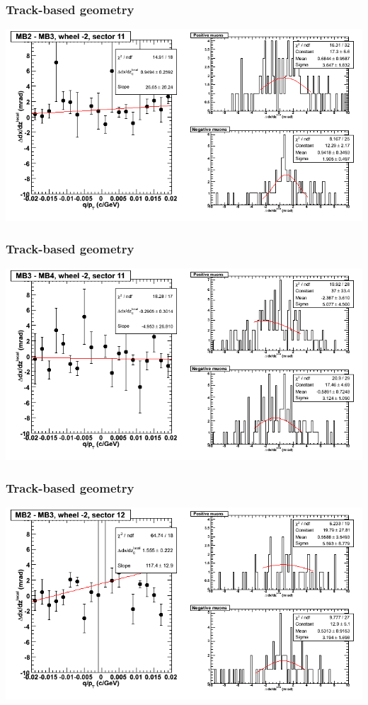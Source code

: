 \documentclass[compress]{beamer}
\begin{document}
\begin{frame}
\frametitle{Track-based geometry}
\includegraphics[width=\linewidth]{NOV4_segdiffs/dt13_slope_A_11_23.png}
\end{frame}

\begin{frame}
\frametitle{Track-based geometry}
\includegraphics[width=\linewidth]{NOV4_segdiffs/dt13_slope_A_11_34.png}
\end{frame}

\begin{frame}
\frametitle{Track-based geometry}
\includegraphics[width=\linewidth]{NOV4_segdiffs/dt13_slope_A_12_23.png}
\end{frame}
\end{document}
